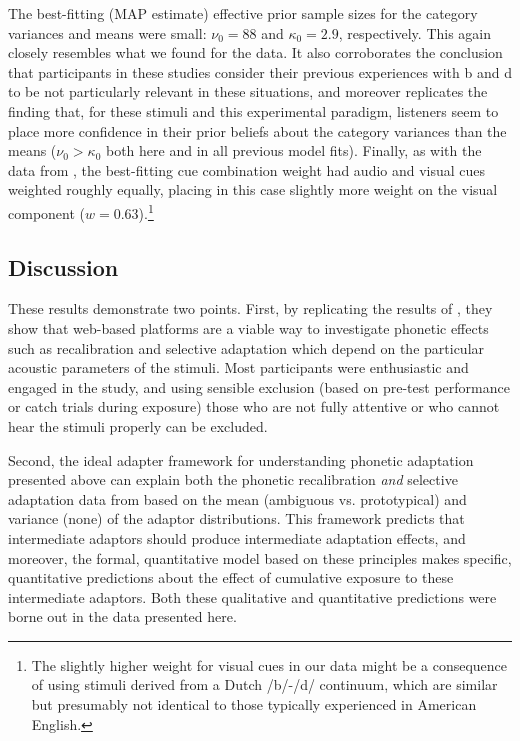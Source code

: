 The best-fitting (MAP estimate) effective prior sample sizes for the category variances and means were small: $\nu_0 = 88$ and $\kappa_0=2.9$, respectively.  This again closely resembles what we found for the \textcite{Vroomen2007} data.  It also corroborates the conclusion that participants in these studies consider their previous experiences with \ph b and \ph d to be not particularly relevant in these situations, 
and moreover replicates the finding that, for these stimuli and this experimental paradigm, listeners seem to place more confidence in their prior beliefs about the category variances than the means ($\nu_0 > \kappa_0$ both here and in all previous model fits).  Finally, as with the data from \textcite{Vroomen2007}, the best-fitting cue combination weight had audio and visual cues weighted roughly equally, placing in this case slightly more weight on the visual component ($w=0.63$).\footnote{The slightly higher weight for visual cues in our data might be a consequence of using stimuli derived from a Dutch /b/-/d/ continuum, which are similar but presumably not identical to those typically experienced in American English.}

\subsection{Discussion}
\label{sec:discussion-3}

These results demonstrate two points.  First, by replicating the results of \textcite{Vroomen2007}, they show that web-based platforms are a viable way to investigate phonetic effects such as recalibration and selective adaptation which depend on the particular acoustic parameters of the stimuli.  Most participants were enthusiastic and engaged in the study, and using sensible exclusion (based on pre-test performance or catch trials during exposure) those who are not fully attentive or who cannot hear the stimuli properly can be excluded.

Second, the ideal adapter framework for understanding phonetic adaptation presented above can explain both the phonetic recalibration \emph{and} selective adaptation data from \textcite{Vroomen2007} based on the mean (ambiguous vs. prototypical) and variance (none) of the adaptor distributions.  This framework predicts that intermediate adaptors should produce intermediate adaptation effects, and moreover, the formal, quantitative model based on these principles makes specific, quantitative predictions about the effect of cumulative exposure to these intermediate adaptors.  Both these qualitative and quantitative predictions were borne out in the data presented here.

